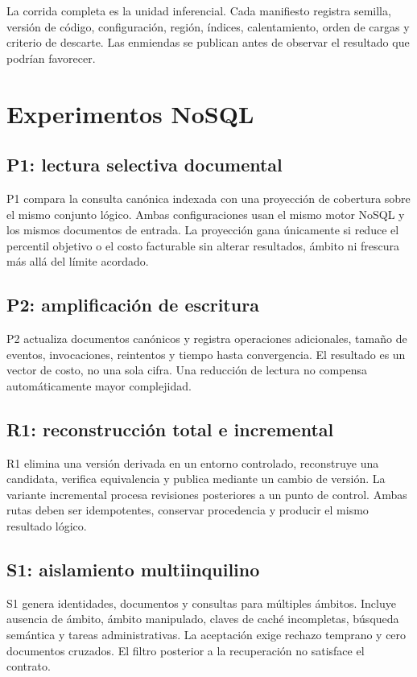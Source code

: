 La corrida completa es la unidad inferencial. Cada manifiesto registra semilla, versión
de código, configuración, región, índices, calentamiento, orden de cargas y criterio de
descarte. Las enmiendas se publican antes de observar el resultado que podrían favorecer.

\chapter{Experimentos NoSQL}

\section{P1: lectura selectiva documental}

P1 compara la consulta canónica indexada con una proyección de cobertura sobre el mismo
conjunto lógico. Ambas configuraciones usan el mismo motor NoSQL y los mismos documentos
de entrada. La proyección gana únicamente si reduce el percentil objetivo o el costo
facturable sin alterar resultados, ámbito ni frescura más allá del límite acordado.

\section{P2: amplificación de escritura}

P2 actualiza documentos canónicos y registra operaciones adicionales, tamaño de eventos,
invocaciones, reintentos y tiempo hasta convergencia. El resultado es un vector de costo,
no una sola cifra. Una reducción de lectura no compensa automáticamente mayor complejidad.

\section{R1: reconstrucción total e incremental}

R1 elimina una versión derivada en un entorno controlado, reconstruye una candidata,
verifica equivalencia y publica mediante un cambio de versión. La variante incremental
procesa revisiones posteriores a un punto de control. Ambas rutas deben ser idempotentes,
conservar procedencia y producir el mismo resultado lógico.

\section{S1: aislamiento multiinquilino}

S1 genera identidades, documentos y consultas para múltiples ámbitos. Incluye ausencia
de ámbito, ámbito manipulado, claves de caché incompletas, búsqueda semántica y tareas
administrativas. La aceptación exige rechazo temprano y cero documentos cruzados. El
filtro posterior a la recuperación no satisface el contrato.

